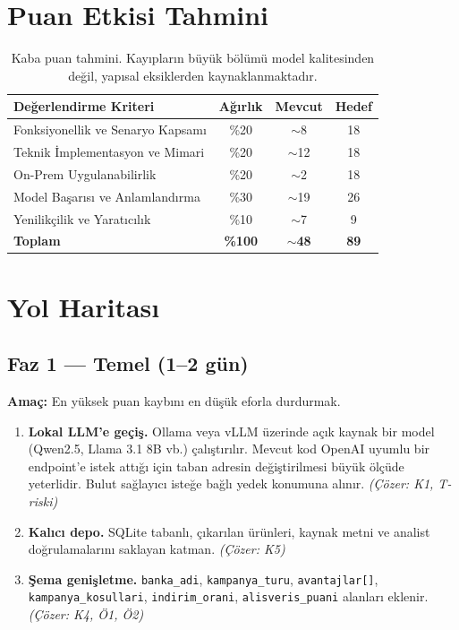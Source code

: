 \documentclass[11pt,a4paper]{article}
\begin{document}
\section{Puan Etkisi Tahmini}

\begin{table}[h]
\centering
\begin{tabular}{p{6.4cm} c c c}
\toprule
\textbf{Değerlendirme Kriteri} & \textbf{Ağırlık} & \textbf{Mevcut} & \textbf{Hedef} \\
\midrule
Fonksiyonellik ve Senaryo Kapsamı & \%20 & $\sim$8 & 18 \\
Teknik İmplementasyon ve Mimari & \%20 & $\sim$12 & 18 \\
On-Prem Uygulanabilirlik & \%20 & $\sim$2 & 18 \\
Model Başarısı ve Anlamlandırma & \%30 & $\sim$19 & 26 \\
Yenilikçilik ve Yaratıcılık & \%10 & $\sim$7 & 9 \\
\midrule
\textbf{Toplam} & \textbf{\%100} & $\sim$\textbf{48} & \textbf{89} \\
\bottomrule
\end{tabular}
\caption{Kaba puan tahmini. Kayıpların büyük bölümü model kalitesinden değil,
yapısal eksiklerden kaynaklanmaktadır.}
\end{table}

\section{Yol Haritası}

\subsection{Faz 1 --- Temel (1--2 gün)}

\textbf{Amaç:} En yüksek puan kaybını en düşük eforla durdurmak.

\begin{enumerate}[leftmargin=1.2cm,itemsep=3pt]
  \item \textbf{Lokal LLM'e geçiş.} Ollama veya vLLM üzerinde açık kaynak bir model
        (Qwen2.5, Llama 3.1 8B vb.) çalıştırılır. Mevcut kod OpenAI uyumlu bir
        endpoint'e istek attığı için taban adresin değiştirilmesi büyük ölçüde
        yeterlidir. Bulut sağlayıcı isteğe bağlı yedek konumuna alınır.
        \emph{(Çözer: K1, T-riski)}
  \item \textbf{Kalıcı depo.} SQLite tabanlı, çıkarılan ürünleri, kaynak metni ve
        analist doğrulamalarını saklayan katman. \emph{(Çözer: K5)}
  \item \textbf{Şema genişletme.} \texttt{banka\_adi}, \texttt{kampanya\_turu},
        \texttt{avantajlar[]}, \texttt{kampanya\_kosullari}, \texttt{indirim\_orani},
        \texttt{alisveris\_puani} alanları eklenir. \emph{(Çözer: K4, Ö1, Ö2)}
\end{enumerate}
\end{document}
